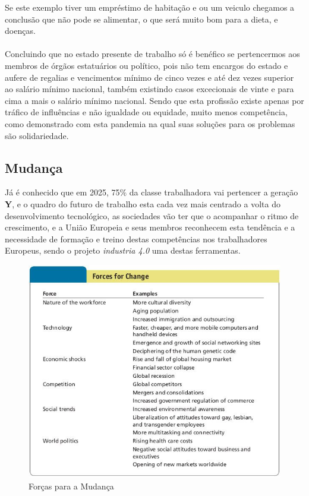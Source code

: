 Se este exemplo tiver um empréstimo de habitação e ou um veiculo chegamos a conclusão que não pode se alimentar, o que será muito bom para a dieta, e doenças.\\
\\
Concluindo que no estado presente de trabalho só é benéfico se pertencermos aos membros de órgãos estatuários ou político, pois não tem encargos do estado e aufere de regalias e vencimentos mínimo de cinco vezes e até dez vezes superior ao salário mínimo nacional, também existindo casos excecionais de vinte e para cima a mais o salário mínimo nacional. Sendo que esta profissão existe apenas por tráfico de influências e não igualdade ou equidade, muito menos competência, como demonstrado com esta pandemia na qual suas soluções para os problemas são solidariedade.
\subsection{Mudança}
\qquad Já é conhecido que em \textsf{2025}, 75\% da classe trabalhadora vai pertencer a geração \textbf{Y}, e o quadro do futuro de trabalho esta cada vez mais centrado a volta do desenvolvimento tecnológico, as sociedades vão ter que o acompanhar o ritmo de crescimento, e a União Europeia e seus membros reconhecem esta tendência e a necessidade de formação e treino destas competências nos trabalhadores Europeus, sendo o projeto \textit{industria 4.0} uma destas ferramentas.
\begin{figure}[H]
	\centering
	\includegraphics[scale=0.52]{./image/Change/Forces for Change.jpg}
	\caption{Forças para a Mudança \cite{book_7}}
\end{figure}
